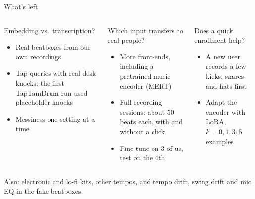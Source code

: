 \begin{frame}{What's left}

  \begin{columns}[T,onlytextwidth]
      \begin{block}{Embedding vs.\ transcription?}
        \footnotesize
        \begin{itemize}
          \item Real beatboxes from our own recordings
          \item Tap queries with real desk knocks; the first TapTamDrum run used placeholder knocks
          \item Messiness one setting at a time
        \end{itemize}
      \end{block}
      \begin{block}{Which input transfers to real people?}
        \footnotesize
        \begin{itemize}
          \item More front-ends, including a pretrained music encoder (MERT)
          \item Full recording sessions: about 50 beats each, with and without a click
          \item Fine-tune on 3 of us, test on the 4th
        \end{itemize}
      \end{block}
      \begin{block}{Does a quick enrollment help?}
        \footnotesize
        \begin{itemize}
          \item A new user records a few kicks, snares and hats first
          \item Adapt the encoder with LoRA, $k = 0, 1, 3, 5$ examples
        \end{itemize}
      \end{block}
  \end{columns}

  \vspace{0.25cm}
  {\footnotesize\color{SoftGray}\raggedright
  Also: electronic and lo-fi kits, other tempos, and tempo drift, swing drift and mic EQ in the fake beatboxes.\par}


\end{frame}
